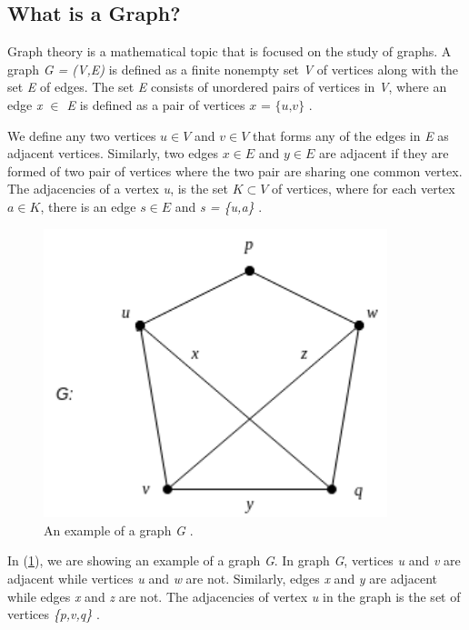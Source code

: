 {\subsection{What is a Graph?}
\label{subsec:Graph?}
Graph theory is a mathematical topic that is focused on the study of graphs. A graph \textit{G = (V,E)} is defined as a finite nonempty set \textit{V} of vertices along with the set \textit{E} of edges. The set \textit{E} consists of unordered pairs of vertices in \textit{V}, where an edge \textit{x \(\in\) E} is defined as a pair of vertices \(\textit{x = \{u,v\}}\) \cite{harary6graph}.

We define any two vertices $u \in V$ and $v \in V$ that forms any of the edges in \textit{E} as adjacent vertices. Similarly, two edges $x \in E$ and $y \in E$ are adjacent if they are formed of two pair of vertices where the two pair are sharing one common vertex. The adjacencies of a vertex \textit{u}, is the set $K \subset V$ of vertices, where for each vertex $a \in K$, there is an edge \mbox{$s \in E$} and \textit{s = \{u,a\}} \cite{harary6graph}.

\begin{figure}
\centering
\includegraphics[width=10cm]{pics/Graph.png}
\caption{An example of a graph \textit{G} \cite{harary6graph}.}
\label{fig:graph}
\end{figure} 

In (\ref{fig:graph}), we are showing an example of a graph \textit{G}. In graph \textit{G}, vertices \textit{u} and \textit{v} are adjacent while vertices \textit{u} and \textit{w} are not. Similarly, edges \textit{x} and \textit{y} are adjacent while edges \textit{x} and \textit{z} are not. The adjacencies of vertex \textit{u} in the graph is the set of vertices \textit{\{p,v,q\}} \cite{harary6graph}.




}

